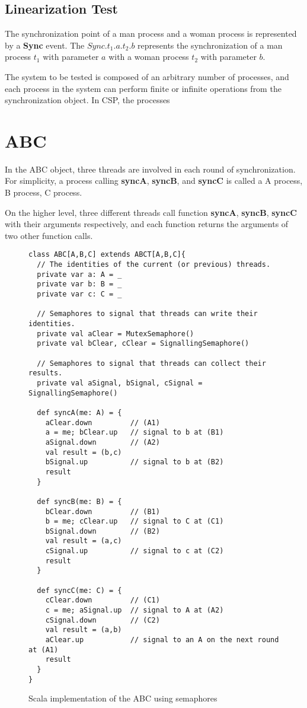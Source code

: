 \documentclass{article}
\begin{document}
\subsection{Linearization Test}
The synchronization point of a man process and a woman process is represented by a \textbf{Sync} event. The $Sync.t_1.a.t_2.b$ represents the synchronization of a man process $t_1$ with parameter $a$ with a woman process $t_2$ with parameter $b$.

The system to be tested is composed of an arbitrary number of processes, and each process in the system can perform finite or infinite operations from the synchronization object. In CSP, the processes 

\section{ABC}
In the ABC object, three threads are involved in each round of synchronization. For simplicity, a process calling \textbf{syncA}, \textbf{syncB}, and \textbf{syncC} is called a A process, B process, C process.  

On the higher level, three different threads call function \textbf{syncA}, \textbf{syncB}, \textbf{syncC} with their arguments respectively, and each function returns the arguments of two other function calls.

\begin{figure}
\begin{verbatim}
class ABC[A,B,C] extends ABCT[A,B,C]{
  // The identities of the current (or previous) threads.
  private var a: A = _
  private var b: B = _
  private var c: C = _

  // Semaphores to signal that threads can write their identities.
  private val aClear = MutexSemaphore()
  private val bClear, cClear = SignallingSemaphore()

  // Semaphores to signal that threads can collect their results. 
  private val aSignal, bSignal, cSignal = SignallingSemaphore()

  def syncA(me: A) = {
    aClear.down         // (A1)
    a = me; bClear.up   // signal to b at (B1)
    aSignal.down        // (A2)
    val result = (b,c)
    bSignal.up          // signal to b at (B2)
    result
  }

  def syncB(me: B) = {
    bClear.down         // (B1)
    b = me; cClear.up   // signal to C at (C1)
    bSignal.down        // (B2)
    val result = (a,c)
    cSignal.up          // signal to c at (C2)
    result
  }

  def syncC(me: C) = {
    cClear.down         // (C1)
    c = me; aSignal.up  // signal to A at (A2)
    cSignal.down        // (C2)
    val result = (a,b)
    aClear.up           // signal to an A on the next round at (A1)
    result
  }
}      
\end{verbatim}
\caption{Scala implementation of the ABC using semaphores}
\label{abc.scala.correct}
\end{figure}
\end{document}
